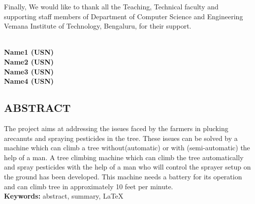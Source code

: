 \documentclass[12pt,a4paper]{article}
\begin{document}
\noindent Finally, We would like to thank all the Teaching, Technical faculty and supporting staff members of Department of Computer Science and Engineering
Vemana Institute of Technology, Bengaluru, for their support.
\\\\[8mm]
\begin{flushright}

\textbf{Name1 (USN)}\\[6mm]

\textbf{Name2 (USN)} \\[6mm]

\textbf{Name3 (USN)} \\[6mm]

\textbf{Name4 (USN)}

\end{flushright}
\newpage
\begin{center}
\section*{ABSTRACT}
\end{center}
\onehalfspacing
The project aims at addressing the issues faced by the farmers in plucking arecanuts and spraying pesticides in the tree. These issues can be solved by a machine which can climb a tree without(automatic) or with (semi-automatic) the help of a man. A tree climbing machine which can climb the tree automatically and spray pesticides with the help of a man who will control the sprayer setup on the ground has been developed. This machine needs a battery for its operation and can climb tree in approximately 10 feet per minute.\\[0.5in]
\textbf{Keywords:} abstract, summary, LaTeX 
\newpage
\end{document}
